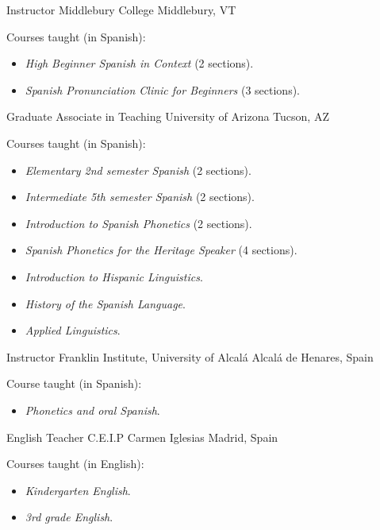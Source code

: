 \documentclass[12pt,letterpaper]{moderncv}
\begin{document}
        {Instructor}
        {Middlebury College}
        {Middlebury, VT}
        {}
        {Courses taught (in Spanish):
        \begin{itemize}
          \item[] \small \emph{High Beginner Spanish in Context} (2 sections).\vspace{-.03in}
          \item[] \small \emph{Spanish Pronunciation Clinic for Beginners} (3 sections).
        \end{itemize}}
        {Graduate Associate in Teaching}
        {University of Arizona}
        {Tucson, AZ}
        {}
        {Courses taught (in Spanish):
        \begin{itemize}
          \item[] \small \emph{Elementary 2nd semester Spanish} (2 sections).\vspace{-.03in}
          \item[] \small \emph{Intermediate 5th semester Spanish} (2 sections).\vspace{-.03in}
          \item[] \small \emph{Introduction to Spanish Phonetics} (2 sections).\vspace{-.03in}
          \item[] \small \emph{Spanish Phonetics for the Heritage Speaker} (4 sections).\vspace{-.03in}
          \item[] \small \emph{Introduction to Hispanic Linguistics}.\vspace{-.03in}
          \item[] \small \emph{History of the Spanish Language}.\vspace{-.03in}
          \item[] \small \emph{Applied Linguistics}.
        \end{itemize}}
        {}
        {Instructor}
        {Franklin Institute, University of Alcalá}
        {Alcalá de Henares, Spain}
        {}
        {Course taught (in Spanish):
        \begin{itemize}
          \item[] \small \emph{Phonetics and oral Spanish}.
        \end{itemize}}
        {English Teacher}
        {C.E.I.P Carmen Iglesias}
        {Madrid, Spain}
        {}
        {Courses taught (in English):
        \begin{itemize}
          \item[] \small \emph{Kindergarten English}.\vspace{-.03in}
          \item[] \small \emph{3rd grade English}.
        \end{itemize}}
\end{document}
